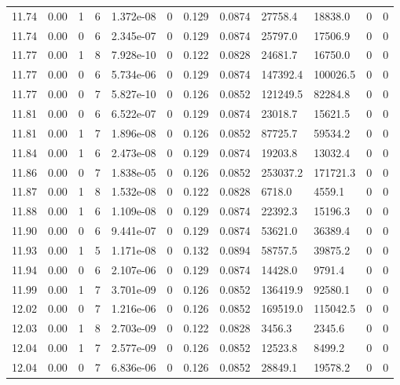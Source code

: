 \documentclass[preview]{standalone}
\begin{document}
{{{{{{{{{{{{{{\begin{tabular}{L{1.2cm}C{1.2cm} C{0.3cm}C{0.5cm} C{1.4cm}C{1.4cm} C{1.4cm}C{1.4cm} C{1.6cm}C{1.6cm} C{1.6cm}C{1.6cm}}
  11.74  &  0.00  & 1     &  6 &  1.372e-08  & 0  &  0.129&   0.0874& 27758.4 & 18838.0   &  0 & 0  \\ 
  11.74  &  0.00  & 0     &  6 &  2.345e-07  & 0  &  0.129&   0.0874& 25797.0 & 17506.9   &  0 & 0  \\ 
  11.77  &  0.00  & 1     &  8 &  7.928e-10  & 0  &  0.122&   0.0828& 24681.7 & 16750.0   &  0 & 0  \\ 
  11.77  &  0.00  & 0     &  6 &  5.734e-06  & 0  &  0.129&   0.0874& 147392.4 & 100026.5   &  0 & 0  \\ 
  11.77  &  0.00  & 0     &  7 &  5.827e-10  & 0  &  0.126&   0.0852& 121249.5 & 82284.8   &  0 & 0  \\ 
  11.81  &  0.00  & 0     &  6 &  6.522e-07  & 0  &  0.129&   0.0874& 23018.7 & 15621.5   &  0 & 0  \\ 
  11.81  &  0.00  & 1     &  7 &  1.896e-08  & 0  &  0.126&   0.0852& 87725.7 & 59534.2   &  0 & 0  \\ 
  11.84  &  0.00  & 1     &  6 &  2.473e-08  & 0  &  0.129&   0.0874& 19203.8 & 13032.4   &  0 & 0  \\ 
  11.86  &  0.00  & 0     &  7 &  1.838e-05  & 0  &  0.126&   0.0852& 253037.2 & 171721.3   &  0 & 0  \\ 
  11.87  &  0.00  & 1     &  8 &  1.532e-08  & 0  &  0.122&   0.0828& 6718.0 & 4559.1   &  0 & 0  \\ 
  11.88  &  0.00  & 1     &  6 &  1.109e-08  & 0  &  0.129&   0.0874& 22392.3 & 15196.3   &  0 & 0  \\ 
  11.90  &  0.00  & 0     &  6 &  9.441e-07  & 0  &  0.129&   0.0874& 53621.0 & 36389.4   &  0 & 0  \\ 
  11.93  &  0.00  & 1     &  5 &  1.171e-08  & 0  &  0.132&   0.0894& 58757.5 & 39875.2   &  0 & 0  \\ 
  11.94  &  0.00  & 0     &  6 &  2.107e-06  & 0  &  0.129&   0.0874& 14428.0 & 9791.4   &  0 & 0  \\ 
  11.99  &  0.00  & 1     &  7 &  3.701e-09  & 0  &  0.126&   0.0852& 136419.9 & 92580.1   &  0 & 0  \\ 
  12.02  &  0.00  & 0     &  7 &  1.216e-06  & 0  &  0.126&   0.0852& 169519.0 & 115042.5   &  0 & 0  \\ 
  12.03  &  0.00  & 1     &  8 &  2.703e-09  & 0  &  0.122&   0.0828& 3456.3 & 2345.6   &  0 & 0  \\ 
  12.04  &  0.00  & 1     &  7 &  2.577e-09  & 0  &  0.126&   0.0852& 12523.8 & 8499.2   &  0 & 0  \\ 
  12.04  &  0.00  & 0     &  7 &  6.836e-06  & 0  &  0.126&   0.0852& 28849.1 & 19578.2   &  0 & 0  \\ 

\end{tabular}}}}}}}}}}}}}}}
\end{document}

